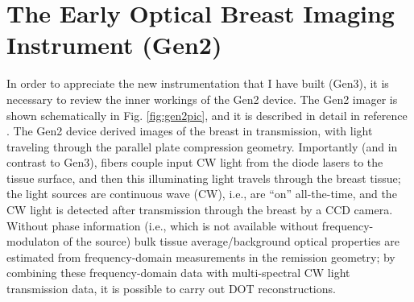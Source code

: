 \section{The Early Optical Breast Imaging Instrument (Gen2)}
In order to appreciate the new instrumentation that I have built (Gen3), it is necessary to review the inner workings of the Gen2 device. The Gen2 imager is shown schematically in Fig. \ref{fig:gen2pic}, and it is described in detail in reference \cite{choe_05_1,choe_09_1}. The Gen2 device derived images of the breast in transmission, with light traveling through the parallel plate compression geometry. Importantly (and in contrast to Gen3), fibers couple input CW light from the diode lasers to the tissue surface, and then this illuminating light travels through the breast tissue; the light  sources are continuous wave (CW), i.e., are “on” all-the-time, and the CW light is detected after transmission through the breast by a CCD camera. Without phase information (i.e., which is not available without frequency-modulaton of the source) bulk tissue average/background optical properties are estimated from frequency-domain measurements in the remission geometry; by combining these frequency-domain data with multi-spectral CW light transmission data, it is possible to carry out DOT reconstructions. 

